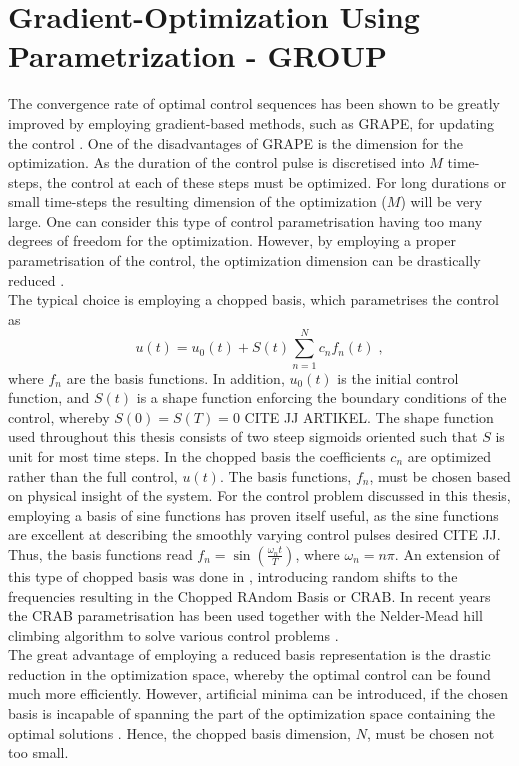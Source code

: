 \section{Gradient-Optimization Using Parametrization - GROUP}
The convergence rate of optimal control sequences has been shown to be greatly improved by employing gradient-based methods, such as GRAPE, for updating the control \cite{Jager2014}.
One of the disadvantages of GRAPE is the dimension for the optimization. As the duration of the control pulse is discretised into $M$ time-steps, the control at each of these steps must be optimized. For long durations or small time-steps the resulting dimension of the optimization ($M$) will be very large. One can consider this type of control parametrisation having too many degrees of freedom for the optimization. 
However, by employing a proper parametrisation of the control, the optimization dimension can be drastically reduced \cite{Winckel2008}.\\
The typical choice is employing a chopped basis, which parametrises the control as
\begin{equation}
	u(t) = u_0 (t) + S(t) \sum_{n=1}^{N} c_n f_n (t) \; , \label{eq:controlParametrization}
\end{equation}   
where $f_n$ are the basis functions. In addition, $u_0 (t)$ is the initial control function, and $S (t)$ is a shape function enforcing the boundary conditions of the control, whereby $S(0) = S(T) = 0$ CITE JJ ARTIKEL. The shape function used throughout this thesis consists of two steep sigmoids oriented such that $S$ is unit for most time steps. In the chopped basis the coefficients $c_n$ are optimized rather than the full control, $u(t)$. The basis functions, $f_n$, must be chosen based on physical insight of the system. For the control problem discussed in this thesis, employing a basis of sine functions has proven itself useful, as the sine functions are excellent at describing the smoothly varying control pulses desired CITE JJ. Thus, the basis functions read $f_n = \sin \left( \frac{\omega_n t}{T} \right)$, where $\omega_n = n \pi$.
An extension of this type of chopped basis was done in \cite{Doria2011,Caneva2011}, introducing random shifts to the frequencies resulting in the Chopped RAndom Basis or \textsc{CRAB}. In recent years the \textsc{CRAB} parametrisation has been used together with the Nelder-Mead hill climbing algorithm to solve various control problems \cite{Doria2011,Caneva2011,FrankBloch,Lloyd2014}.\\
The great advantage of employing a reduced basis representation is the drastic reduction in the optimization space, whereby the optimal control can be found much more efficiently. However, artificial minima can be introduced, if the chosen basis is incapable of spanning the part of the optimization space containing the optimal solutions \cite{Rach2015}. Hence, the chopped basis dimension, $N$, must be chosen not too small.\\

